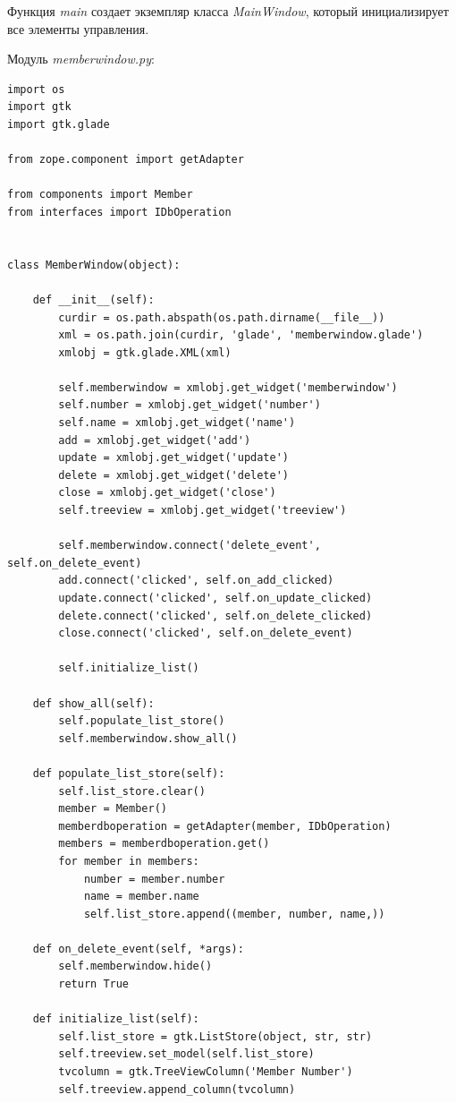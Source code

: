 \documentclass[a4paper,openany,twoside,draft]{book}
\providecommand*{\DUroletitlereference}[1]{\textsl{#1}}
\begin{document}
Функция \DUroletitlereference{main} создает экземпляр класса \DUroletitlereference{MainWindow}, который инициализирует все элементы управления.

Модуль \DUroletitlereference{memberwindow.py}:

\begin{verbatim}
import os
import gtk
import gtk.glade

from zope.component import getAdapter

from components import Member
from interfaces import IDbOperation


class MemberWindow(object):

    def __init__(self):
        curdir = os.path.abspath(os.path.dirname(__file__))
        xml = os.path.join(curdir, 'glade', 'memberwindow.glade')
        xmlobj = gtk.glade.XML(xml)

        self.memberwindow = xmlobj.get_widget('memberwindow')
        self.number = xmlobj.get_widget('number')
        self.name = xmlobj.get_widget('name')
        add = xmlobj.get_widget('add')
        update = xmlobj.get_widget('update')
        delete = xmlobj.get_widget('delete')
        close = xmlobj.get_widget('close')
        self.treeview = xmlobj.get_widget('treeview')

        self.memberwindow.connect('delete_event', self.on_delete_event)
        add.connect('clicked', self.on_add_clicked)
        update.connect('clicked', self.on_update_clicked)
        delete.connect('clicked', self.on_delete_clicked)
        close.connect('clicked', self.on_delete_event)

        self.initialize_list()

    def show_all(self):
        self.populate_list_store()
        self.memberwindow.show_all()

    def populate_list_store(self):
        self.list_store.clear()
        member = Member()
        memberdboperation = getAdapter(member, IDbOperation)
        members = memberdboperation.get()
        for member in members:
            number = member.number
            name = member.name
            self.list_store.append((member, number, name,))

    def on_delete_event(self, *args):
        self.memberwindow.hide()
        return True

    def initialize_list(self):
        self.list_store = gtk.ListStore(object, str, str)
        self.treeview.set_model(self.list_store)
        tvcolumn = gtk.TreeViewColumn('Member Number')
        self.treeview.append_column(tvcolumn)


\end{verbatim}
\end{document}
